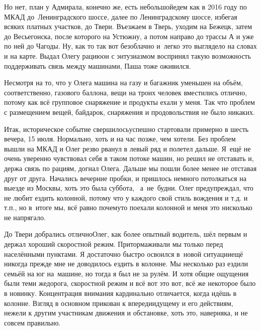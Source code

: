 Но нет, план у Адмирала, конечно же, есть небольшой\mdash едем как в 2016 году по МКАД до~Ленинградского шоссе, далее по Ленинградскому шоссе, избегая всяких платных участков, до Твери. Въезжаем в Тверь, уходим на Бежецк, затем до Весьегонска, после которого на Устюжну, а потом направо до трассы А и уже по ней до Чагоды. Ну, как то так вот безоблачно и~легко это выглядело на словах и на карте. Выдал Олегу рацию\mdash он с энтузиазмом воспринял такую возможность поддерживать связь между машинами, Паша тоже оживился. 

Несмотря на то, что у Олега машина на газу и багажник уменьшен на объём, соответственно, газового баллона, вещи на троих человек вместились отлично, потому как всё групповое снаряжение и продукты ехали у меня. Так что проблем с размещением вещей, байдарок, снаряжения и продовольствия не было никаких.

Итак, историческое событие свершилось\mdash успешно стартовали примерно в шесть вечера, 15 июля. Нормально, хоть и на час позже, чем хотели. Без проблем вышли на МКАД и Олег резво рванул в левый ряд и полетел дальше. Я~ещё не очень уверенно чувствовал себя в таком потоке машин, но решил не отставать и, держа связь по рациям, догнал Олега. Дальше мы пошли более менее не отставая друг от друга. Начались вечерние пробки, и пришлось немного потолкаться на выезде из Москвы, хоть это была суббота, ~а~не~будни. Олег предупреждал, что не любит ездить колонной, потому что у каждого свой стиль вождения и т.д. и т.п., но в~итоге мы, всё равно почему\sdash то поехали колонной и меня это нисколько не напрягало.

До Твери добрались отлично\mdash Олег, как более опытный водитель, шёл первым и держал хороший скоростной режим. Притормаживали мы только перед населёнными пунктами. %
Я достаточно быстро освоился в~новой ситуации\mdash ещё никогда прежде мне не доводилось ездить в колонне. Мы несколько раз ездили семьёй на юг на~машине, но тогда я был не за рулём. И хотя общие ощущения были теми же\mdash дорога, скоростной режим и всё вот это вот, всё же некоторое было в новинку. Концентрация внимания кардинально отличается, когда идёшь в колонне. Взгляд в основном прикован к впередиидущему и его действиям, нежели к другим участникам движения и обстановке, хоть это, наверняка, и не совсем правильно. 


